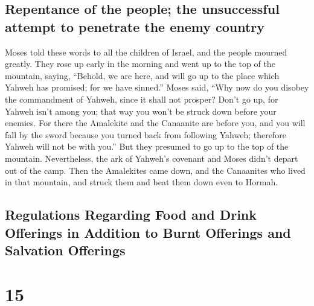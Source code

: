 \hypertarget{repentance-of-the-people-the-unsuccessful-attempt-to-penetrate-the-enemy-country}{%
\subsection{Repentance of the people; the unsuccessful attempt to
penetrate the enemy
country}\label{repentance-of-the-people-the-unsuccessful-attempt-to-penetrate-the-enemy-country}}

 Moses told these words to all the children of Israel,
and the people mourned greatly.  They rose up early in
the morning and went up to the top of the mountain, saying, ``Behold, we
are here, and will go up to the place which Yahweh has promised; for we
have sinned.''  Moses said, ``Why now do you disobey the
commandment of Yahweh, since it shall not prosper?  Don't
go up, for Yahweh isn't among you; that way you won't be struck down
before your enemies.  For there the Amalekite and the
Canaanite are before you, and you will fall by the sword because you
turned back from following Yahweh; therefore Yahweh will not be with
you.''  But they presumed to go up to the top of the
mountain. Nevertheless, the ark of Yahweh's covenant and Moses didn't
depart out of the camp.  Then the Amalekites came down,
and the Canaanites who lived in that mountain, and struck them and beat
them down even to Hormah.

\hypertarget{regulations-regarding-food-and-drink-offerings-in-addition-to-burnt-offerings-and-salvation-offerings}{%
\subsection{Regulations Regarding Food and Drink Offerings in Addition
to Burnt Offerings and Salvation
Offerings}\label{regulations-regarding-food-and-drink-offerings-in-addition-to-burnt-offerings-and-salvation-offerings}}

\hypertarget{section-14}{%
\section{15}\label{section-14}}

